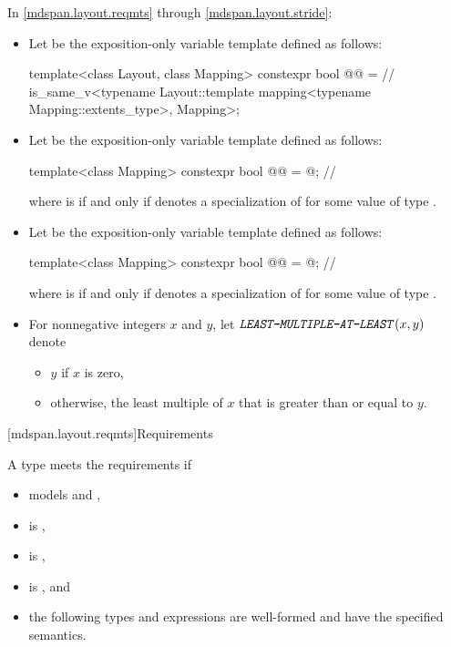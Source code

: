 \pnum
In \ref{mdspan.layout.reqmts} through \ref{mdspan.layout.stride}:
\begin{itemize}
\item
Let  be the exposition-only variable template defined as follows:
\begin{codeblock}
template<class Layout, class Mapping>
constexpr bool @@ =  // \expos
  is_same_v<typename Layout::template mapping<typename Mapping::extents_type>, Mapping>;
\end{codeblock}
\item
Let  be
the exposition-only variable template defined as follows:
\begin{codeblock}
template<class Mapping>
constexpr bool @@ = @\seebelow@;   // \expos
\end{codeblock}
where  is 
if and only if  denotes
a specialization of 
for some value  of type .
\item
Let  be
the exposition-only variable template defined as follows:
\begin{codeblock}
template<class Mapping>
constexpr bool @@ = @\seebelow@;   // \expos
\end{codeblock}
where  is 
if and only if  denotes
a specialization of 
for some value  of type .
\item
For nonnegative integers $x$ and $y$,
let $\texttt{\protect\textit{LEAST-MULTIPLE-AT-LEAST}}(x, y)$ denote
\begin{itemize}
\item
$y$ if $x$ is zero,
\item
otherwise, the least multiple of $x$ that is greater than or equal to $y$.
\end{itemize}
\end{itemize}

[mdspan.layout.reqmts]{Requirements}

\pnum
A type  meets the  requirements if

\begin{itemize}
\item
{} models  and ,
\item
{} is ,
\item
{} is ,
\item
{} is , and
\item
the following types and expressions are well-formed and
have the specified semantics.
\end{itemize}

